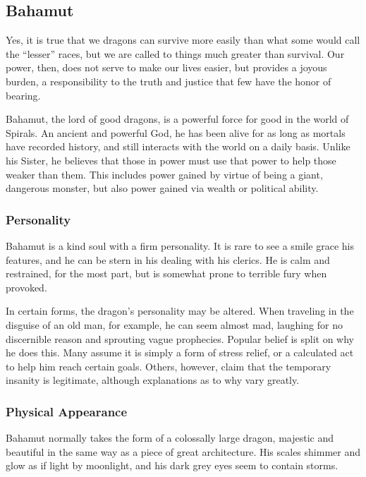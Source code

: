 \subsection*{Bahamut}
\begin{goddesc}
\end{goddesc}
\begin{itquote}
Yes, it is true that we dragons can survive more easily than what some would call the ``lesser'' races, but we are called to things much greater than survival.
Our power, then, does not serve to make our lives easier, but provides a joyous burden, a responsibility to the truth and justice that few have the honor of bearing. 
\end{itquote}
Bahamut, the lord of good dragons, is a powerful force for good in the world of Spirals.
An ancient and powerful God, he has been alive for as long as mortals have recorded history, and still interacts with the world on a daily basis.
Unlike his Sister, he believes that those in power must use that power to help those weaker than them.
This includes power gained by virtue of being a giant, dangerous monster, but also power gained via wealth or political ability.
\subsubsection*{Personality}
Bahamut is a kind soul with a firm personality.
It is rare to see a smile grace his features, and he can be stern in his dealing with his clerics.
He is calm and restrained, for the most part, but is somewhat prone to terrible fury when provoked.

In certain forms, the dragon's personality may be altered.
When traveling in the disguise of an old man, for example, he can seem almost mad, laughing for no discernible reason and sprouting vague prophecies.
Popular belief is split on why he does this.
Many assume it is simply a form of stress relief, or a calculated act to help him reach certain goals.
Others, however, claim that the temporary insanity is legitimate, although explanations as to why vary greatly.

\subsubsection*{Physical Appearance}
Bahamut normally takes the form of a colossally large dragon, majestic and beautiful in the same way as a piece of great architecture.
His scales shimmer and glow as if light by moonlight, and his dark grey eyes seem to contain storms.

